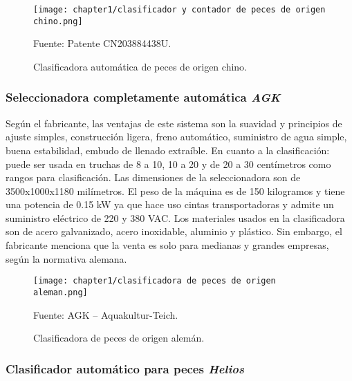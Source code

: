 \begin{figure}[H]
	\centering
	\texttt{[image: chapter1/clasificador y contador de peces de origen chino.png]}
	\caption{Clasificadora automática de peces de origen chino.}
	\begin{myflushleftportland}
		Fuente: Patente CN203884438U.
	\end{myflushleftportland}
	\label{fig:clasificador y contador de peces de origen chino}
\end{figure}

\subsubsection{Seleccionadora completamente automática \textit{AGK}}

Según el fabricante, las ventajas de este sistema son la suavidad y principios de ajuste simples, construcción ligera, freno automático, suministro de agua simple, buena estabilidad, embudo de llenado extraíble. En cuanto a la clasificación: puede ser usada en truchas de 8 a 10, 10 a 20 y de 20 a 30 centímetros como rangos para clasificación. Las dimensiones de la seleccionadora son de 3500x1000x1180 milímetros. El peso de la máquina es de 150 kilogramos y tiene una potencia de 0.15 kW ya que hace uso cintas transportadoras y admite un suministro eléctrico de 220 y 380 VAC. Los materiales usados en la clasificadora son de acero galvanizado, acero inoxidable, aluminio y plástico.\citep{AGKAquakultur-Teich2010} Sin embargo, el fabricante menciona que la venta es solo para medianas y grandes empresas, según la normativa alemana.

\begin{figure}[H]
	\centering
	\texttt{[image: chapter1/clasificadora de peces de origen aleman.png]}
	\caption{Clasificadora de peces de origen alemán.}
	\begin{myflushleftportland}		
		Fuente: AGK – Aquakultur-Teich.
	\end{myflushleftportland}
	\label{fig:clasificadora de peces de origen aleman}
\end{figure}

\subsubsection{Clasificador automático para peces \textit{Helios}}
\label{sssec:clasificador automatico para peces helios}

